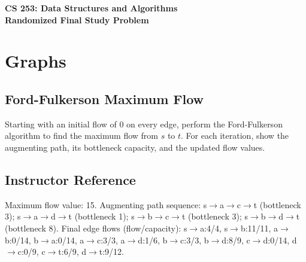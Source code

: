 \documentclass[11pt]{article}
\begin{document}
\begin{center}
    \Large\textbf{CS 253: Data Structures and Algorithms}\\
    \large\textbf{Randomized Final Study Problem}
\end{center}
\vspace{1em}


\section*{Graphs}
\subsection*{Ford-Fulkerson Maximum Flow}
Starting with an initial flow of 0 on every edge, perform the Ford-Fulkerson algorithm to find the maximum flow from $s$ to $t$. For each iteration, show the augmenting path, its bottleneck capacity, and the updated flow values.

\begin{center}
\end{center}

\subsection*{Instructor Reference}
Maximum flow value: 15.
Augmenting path sequence: s$\to$a$\to$c$\to$t (bottleneck 3); s$\to$a$\to$d$\to$t (bottleneck 1); s$\to$b$\to$c$\to$t (bottleneck 3); s$\to$b$\to$d$\to$t (bottleneck 8).
Final edge flows (flow/capacity): s$\to$a:4/4, s$\to$b:11/11, a$\to$b:0/14, b$\to$a:0/14, a$\to$c:3/3, a$\to$d:1/6, b$\to$c:3/3, b$\to$d:8/9, c$\to$d:0/14, d$\to$c:0/9, c$\to$t:6/9, d$\to$t:9/12.
\end{document}
